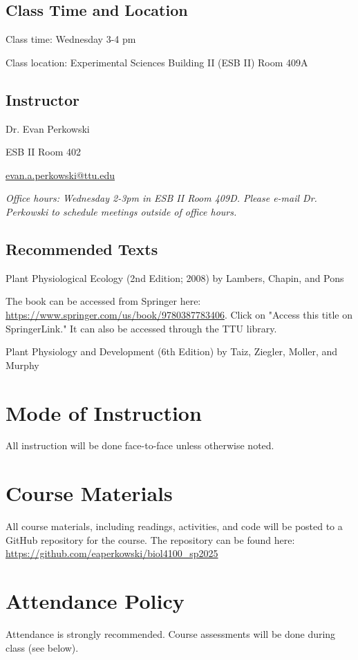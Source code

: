 \documentclass[12pt, notitlepage]{article}   	%
\begin{document}
{\subsection{Class Time and Location}
Class time: Wednesday 3-4 pm\par
Class location: Experimental Sciences Building II (ESB II) Room 409A

\subsection{Instructor}
Dr. Evan Perkowski \par
ESB II Room 402 \par
\href{mailto:evan.a.perkowski@ttu.edu}{evan.a.perkowski@ttu.edu} \par 
\textit{Office hours: Wednesday 2-3pm in ESB II Room 409D. Please e-mail Dr. Perkowski to schedule meetings outside of office hours.}

\subsection{Recommended Texts}
Plant Physiological Ecology (2nd Edition; 2008) by Lambers, Chapin, and Pons \par
The book can be accessed from Springer here: \url{https://www.springer.com/us/book/9780387783406}. Click on "Access this title on SpringerLink." It can also be accessed through the TTU library. \par
Plant Physiology and Development (6th Edition) by Taiz, Ziegler, Moller, and Murphy

\section{Mode of Instruction}
All instruction will be done face-to-face unless otherwise noted.

\section{Course Materials}
All course materials, including readings, activities, and code will be posted to a GitHub repository for the course. The repository can be found here: 
\url{https://github.com/eaperkowski/biol4100_sp2025}

\section{Attendance Policy}
Attendance is strongly recommended. Course assessments will be done during class (see below).

}
\end{document}
